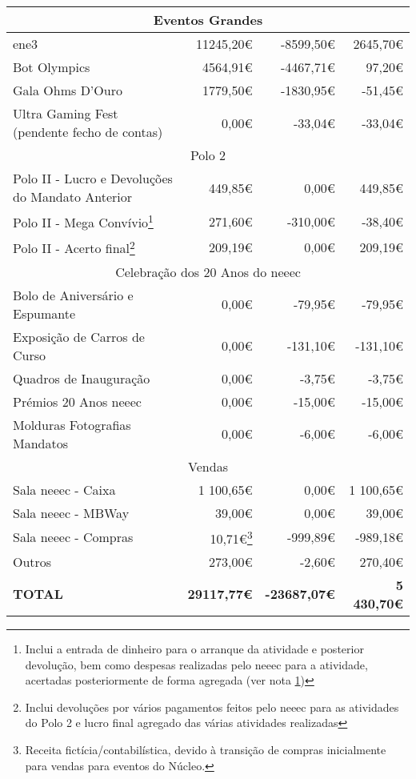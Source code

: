 \begin{longtable}{Xrrr}
\hline
\multicolumn{4}{c}{Eventos Grandes} \\
\hline
\acrshort{ene3} & 11245,20€ & -8599,50€ & 2645,70€ \\
Bot Olympics & 4564,91€ & -4467,71€ & 97,20€ \\
Gala Ohms D'Ouro & 1779,50€ & -1830,95€ & -51,45€ \\
Ultra Gaming Fest (pendente fecho de contas) & 0,00€ & -33,04€ & -33,04€ \\

\hline
\multicolumn{4}{c}{Polo 2} \\
\hline
Polo II - Lucro e Devoluções do Mandato Anterior & 449,85€ & 0,00€ & 449,85€ \\
Polo II - Mega Convívio\footnote{Inclui a entrada de dinheiro para o arranque da atividade e posterior devolução, bem como despesas realizadas pelo \acrshort{neeec} para a atividade, acertadas posteriormente de forma agregada (ver nota \ref{footnote:polo2-acerto})} & 271,60€ & -310,00€ & -38,40€ \\
Polo II - Acerto final\footnote{\label{footnote:polo2-acerto}Inclui devoluções por vários pagamentos feitos pelo \acrshort{neeec} para as atividades do Polo 2 e lucro final agregado das várias atividades realizadas} & 209,19€ & 0,00€ & 209,19€ \\

\hline
\multicolumn{4}{c}{Celebração dos 20 Anos do \acrshort{neeec}} \\
\hline
Bolo de Aniversário e Espumante & 0,00€ & -79,95€ & -79,95€ \\
Exposição de Carros de Curso & 0,00€ & -131,10€ & -131,10€ \\
Quadros de Inauguração & 0,00€ & -3,75€ & -3,75€ \\
Prémios 20 Anos \acrshort{neeec} & 0,00€ & -15,00€ & -15,00€ \\
Molduras Fotografias Mandatos & 0,00€ & -6,00€ & -6,00€ \\

\hline
\multicolumn{4}{c}{Vendas} \\
\hline
Sala \acrshort{neeec} - Caixa & 1 100,65€ & 0,00€ & 1 100,65€ \\
Sala \acrshort{neeec} - MBWay & 39,00€ & 0,00€ & 39,00€ \\
Sala \acrshort{neeec} - Compras & 10,71€\footnote{Receita fictícia/contabilística, devido à transição de compras inicialmente para vendas para eventos do Núcleo.} & -999,89€ & -989,18€ \\
Outros & 273,00€ & -2,60€ & 270,40€ \\

\midrule \midrule

\bfseries TOTAL & \bfseries 29117,77€ & \bfseries -23687,07€ & \bfseries 5 430,70€ \\

\end{longtable}